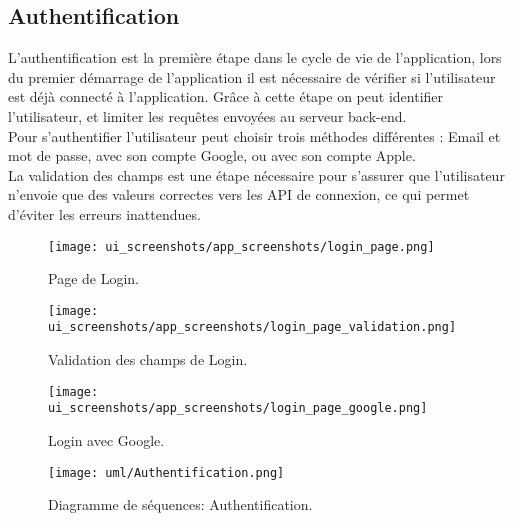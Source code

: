 \subsection{Authentification}
L'authentification est la première étape dans le cycle de vie de l'application, lors du premier démarrage de l'application il est nécessaire de vérifier si l'utilisateur est déjà connecté à l'application. Grâce à cette étape on peut identifier l'utilisateur, et limiter les requêtes envoyées au serveur back-end.\\
\noindent Pour s'authentifier l'utilisateur peut choisir trois méthodes différentes : Email et mot de passe, avec son compte Google, ou avec son compte Apple.\\
La validation des champs est une étape nécessaire pour s'assurer que l'utilisateur n'envoie que des valeurs correctes vers les API de connexion, ce qui permet d'éviter les erreurs inattendues.
\vspace{1cm}
\begin{center}
    \begin{multicols}{2}
        \begin{figure}[H]
            \centering
            \texttt{[image: ui\_screenshots/app\_screenshots/login\_page.png]}
            \vspace{1cm}
            \caption{Page de Login.}
            \label{fig:app_login}
        \end{figure}
        \begin{figure}[H]
            \centering
            \texttt{[image: ui\_screenshots/app\_screenshots/login\_page\_validation.png]}
            \vspace{1cm}
            \caption{Validation des champs de Login.}
            \label{fig:app_login_validation}
        \end{figure}
    \end{multicols}
\end{center}

\begin{center}
    \begin{figure}[H]
        \centering
        \texttt{[image: ui\_screenshots/app\_screenshots/login\_page\_google.png]}
        \vspace{1cm}
        \caption{Login avec Google.}
        \label{fig:app_login_google}
    \end{figure}
\end{center}
\vspace{1cm}
\begin{figure}[H]
    \centering
    \texttt{[image: uml/Authentification.png]}
    \vspace{1cm}
    \caption{Diagramme de séquences: Authentification.}
    \label{fig:seq_auth}
\end{figure}
